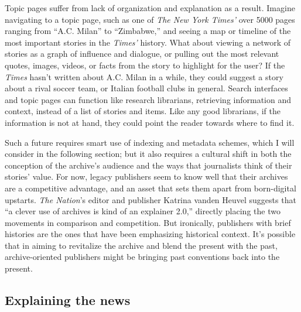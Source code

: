 Topic pages suffer from lack of organization and explanation as a result. Imagine navigating to a topic page, such as one of \emph{The New York Times'} over 5000 pages ranging from ``A.C. Milan'' to ``Zimbabwe,'' and seeing a map or timeline of the most important stories in the \emph{Times'} history. What about viewing a network of stories as a graph of influence and dialogue, or pulling out the most relevant quotes, images, videos, or facts from the story to highlight for the user? If the \emph{Times} hasn't written about A.C. Milan in a while, they could suggest a story about a rival soccer team, or Italian football clubs in general. Search interfaces and topic pages can function like research librarians, retrieving information and context, instead of a list of stories and items. Like any good librarians, if the information is not at hand, they could point the reader towards where to find it.

Such a future requires smart use of indexing and metadata schemes, which I will consider in the following section; but it also requires a cultural shift in both the conception of the archive's audience and the ways that journalists think of their stories' value. For now, legacy publishers seem to know well that their archives are a competitive advantage, and an asset that sets them apart from born-digital upstarts. \emph{The Nation}'s editor and publisher Katrina vanden Heuvel suggests that ``a clever use of archives is kind of an explainer 2.0,'' directly placing the two movements in comparison and competition.\autocite{levy_time.com_2014} But ironically, publishers with brief histories are the ones that have been emphasizing historical context. It's possible that in aiming to revitalize the archive and blend the present with the past, archive-oriented publishers might be bringing past conventions back into the present.

\subsection{Explaining the news}

